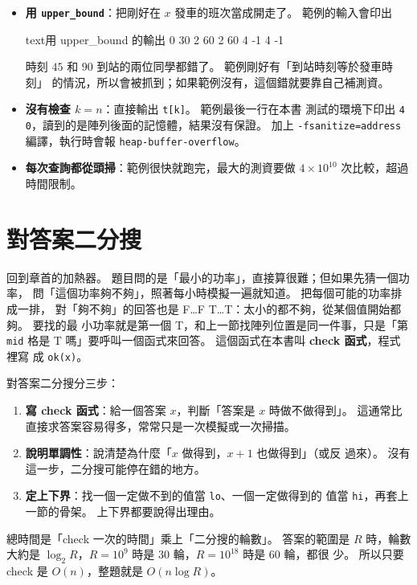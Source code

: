 \begin{itemize}
\item \textbf{用 \texttt{upper\_bound}}：把剛好在 $x$ 發車的班次當成開走了。
範例的輸入會印出
\begin{code}{text}{用 upper\_bound 的輸出}
0 30
2 60
2 60
4 -1
4 -1
\end{code}
時刻 $45$ 和 $90$ 到站的兩位同學都錯了。 範例剛好有「到站時刻等於發車時刻」
的情況，所以會被抓到；如果範例沒有，這個錯就要靠自己補測資。
\item \textbf{沒有檢查 $k = n$}：直接輸出 \texttt{t[k]}。 範例最後一行在本書
測試的環境下印出 \texttt{4 0}，讀到的是陣列後面的記憶體，結果沒有保證。 加上
\texttt{-fsanitize=address} 編譯，執行時會報 \texttt{heap-buffer-overflow}。
\item \textbf{每次查詢都從頭掃}：範例很快就跑完，最大的測資要做
$4 \times 10^{10}$ 次比較，超過時間限制。
\end{itemize}

\section{對答案二分搜}
\label{sec:bs-answer}

回到章首的加熱器。 題目問的是「最小的功率」，直接算很難；但如果先猜一個功率，
問「這個功率夠不夠」，照著每小時模擬一遍就知道。 把每個可能的功率排成一排，
對「夠不夠」的回答也是 F…F T…T：太小的都不夠，從某個值開始都夠。 要找的最
小功率就是第一個 T，和上一節找陣列位置是同一件事，只是「第 \texttt{mid} 格是
T 嗎」要呼叫一個函式來回答。 這個函式在本書叫 \textbf{check 函式}，程式裡寫
成 \texttt{ok(x)}。

對答案二分搜分三步：

\begin{enumerate}
\item \textbf{寫 check 函式}：給一個答案 $x$，判斷「答案是 $x$ 時做不做得到」。
這通常比直接求答案容易得多，常常只是一次模擬或一次掃描。
\item \textbf{說明單調性}：說清楚為什麼「$x$ 做得到，$x + 1$ 也做得到」（或反
過來）。 沒有這一步，二分搜可能停在錯的地方。
\item \textbf{定上下界}：找一個一定做不到的值當 \texttt{lo}、一個一定做得到的
值當 \texttt{hi}，再套上一節的骨架。 上下界都要說得出理由。
\end{enumerate}

總時間是「check 一次的時間」乘上「二分搜的輪數」。 答案的範圍是 $R$ 時，輪數
大約是 $\log_2 R$，$R = 10^9$ 時是 $30$ 輪，$R = 10^{18}$ 時是 $60$ 輪，都很
少。 所以只要 check 是 $O(n)$，整題就是 $O(n \log R)$。

